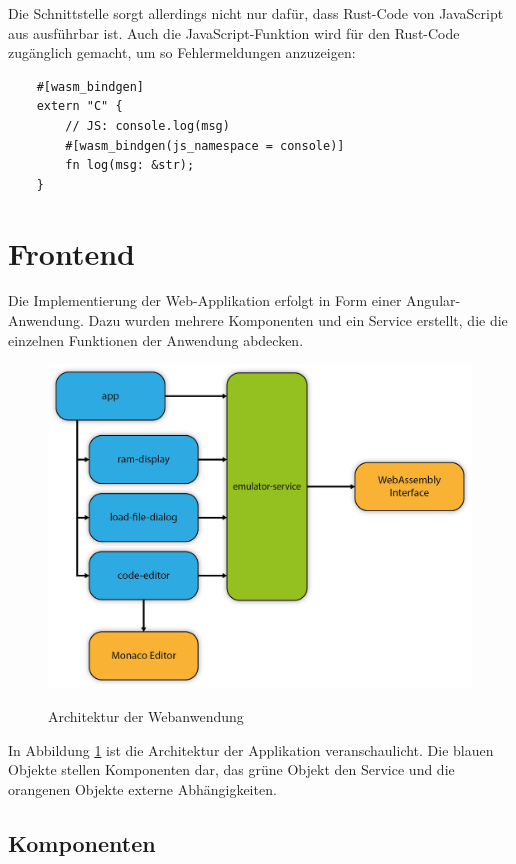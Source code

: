 Die Schnittstelle sorgt allerdings nicht nur dafür, dass Rust-Code von JavaScript aus ausführbar ist. Auch die JavaScript-Funktion  wird für den Rust-Code zugänglich gemacht, um so Fehlermeldungen anzuzeigen:

\begin{verbatim}
    #[wasm_bindgen]
    extern "C" {
        // JS: console.log(msg)
        #[wasm_bindgen(js_namespace = console)]
        fn log(msg: &str);
    }
\end{verbatim}

\section{Frontend}

Die Implementierung der Web-Applikation erfolgt in Form einer Angular-Anwendung. Dazu wurden mehrere Komponenten und ein Service erstellt, die die einzelnen Funktionen der Anwendung abdecken.

\begin{figure}
    \caption{Architektur der Webanwendung}
    \centering
    \includegraphics[width=1.0\textwidth]{Bilder/AngularArchitektur.png}
    \label{fig:architecture}
\end{figure}

In Abbildung \ref{fig:architecture} ist die Architektur der Applikation veranschaulicht. Die blauen Objekte stellen Komponenten dar, das grüne Objekt den Service und die orangenen Objekte externe Abhängigkeiten.

\subsection{Komponenten}

